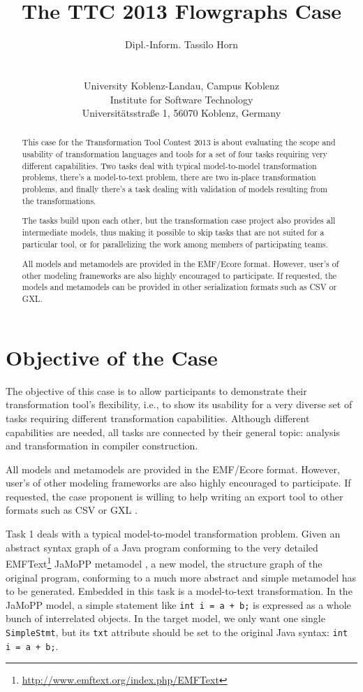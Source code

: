 \documentclass[11pt]{article}
\title{The TTC 2013 Flowgraphs Case}
\author{Dipl.-Inform. Tassilo Horn\\
  \myemail\\
  \vspace{0.3cm}\\
  University Koblenz-Landau, Campus Koblenz\\
  Institute for Software Technology\\
  Universitätsstraße 1, 56070 Koblenz, Germany}
\begin{document}
\maketitle

\begin{abstract}
  This case for the Transformation Tool Contest 2013 is about evaluating the
  scope and usability of transformation languages and tools for a set of four
  tasks requiring very different capabilities.  Two tasks deal with typical
  model-to-model transformation problems, there's a model-to-text problem,
  there are two in-place transformation problems, and finally there's a task
  dealing with validation of models resulting from the transformations.

  The tasks build upon each other, but the transformation case project also
  provides all intermediate models, thus making it possible to skip tasks that
  are not suited for a particular tool, or for parallelizing the work among
  members of participating teams.

  All models and metamodels are provided in the EMF/Ecore format.  However,
  user's of other modeling frameworks are also highly encouraged to
  participate.  If requested, the models and metamodels can be provided in
  other serialization formats such as CSV or GXL.
\end{abstract}

\sloppy

\section{Objective of the Case}
\label{sec:objective}

The objective of this case is to allow participants to demonstrate their
transformation tool's flexibility, i.e., to show its usability for a very
diverse set of tasks requiring different transformation capabilities.  Although
different capabilities are needed, all tasks are connected by their general
topic: analysis and transformation in compiler construction.

All models and metamodels are provided in the EMF/Ecore format.  However,
user's of other modeling frameworks are also highly encouraged to participate.
If requested, the case proponent is willing to help writing an export tool to
other formats such as CSV or GXL \cite{GXL02}.

Task 1 deals with a typical model-to-model transformation problem.  Given an
abstract syntax graph of a Java program conforming to the very detailed
EMFText\footnote{\url{http://www.emftext.org/index.php/EMFText}} JaMoPP
metamodel \cite{jamopp09}, a new model, the structure graph of the original
program, conforming to a much more abstract and simple metamodel has to be
generated.  Embedded in this task is a model-to-text transformation.  In the
JaMoPP model, a simple statement like \verb|int i = a + b;| is expressed as a
whole bunch of interrelated objects.  In the target model, we only want one
single \verb|SimpleStmt|, but its \verb|txt| attribute should be set to the
original Java syntax: \verb|int i = a + b;|.
\end{document}

